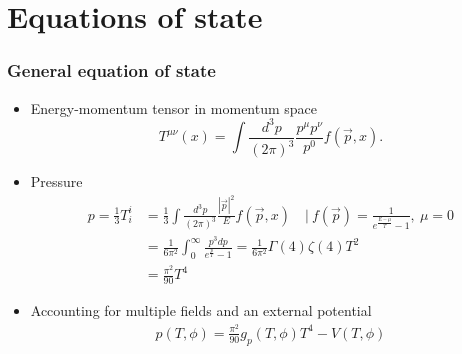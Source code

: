 \section{Equations of state}

\begin{frame}
    \frametitle{General equation of state}
    \begin{itemize}
        \item Energy-momentum tensor in momentum space
        \begin{equation}
            T^{\mu \nu}(x) = \int \frac{d^3 p}{(2 \pi)^3} \frac{p^\mu p^\nu}{p^0} f(\vec{p},x).
        \end{equation}
        \item Pressure
        \begin{align}
            p = \frac{1}{3} T^i_i
            &= \frac{1}{3} \int \frac{d^3 p}{(2 \pi)^3} \frac{|\vec{p}|^2}{E} f(\vec{p},x) \quad \big| \ f(\vec{p}) = \frac{1}{e^\frac{E-\mu}{T} - 1}, \ \mu = 0\\
            &= \frac{1}{6 \pi^2} \int_0^\infty \frac{p^3 dp}{e^\frac{p}{T} - 1}
            = \frac{1}{6 \pi^2} \Gamma(4) \zeta(4) T^2 \\
            &= \frac{\pi^2}{90} T^4
        \end{align}
        \item Accounting for multiple fields and an external potential
        \begin{align}
            p(T,\phi) = \frac{\pi^2}{90} g_p(T,\phi) T^4 - V(T,\phi)
        \end{align}
    \end{itemize}
\end{frame}

